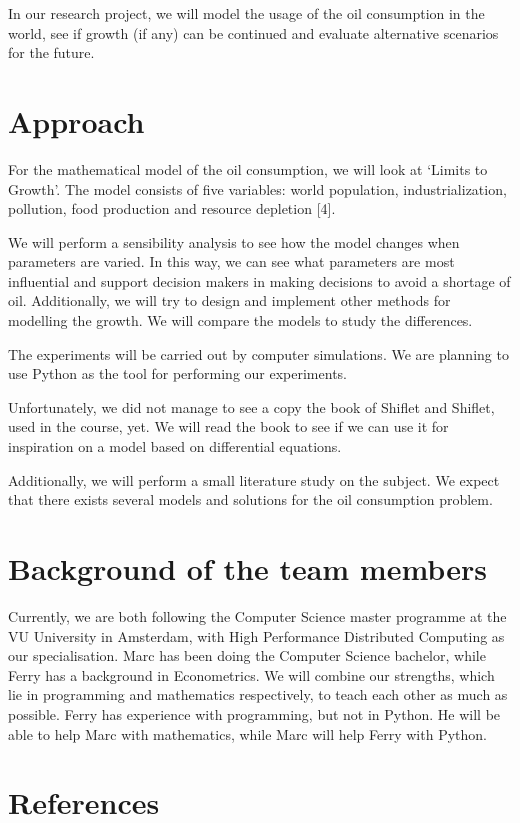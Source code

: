 \documentclass[10pt,a4paper]{article}
\begin{document}
In our research project, we will model the usage of the oil consumption in the world, see if growth (if any) can be continued and evaluate alternative scenarios for the future.

\section*{Approach}

For the mathematical model of the oil consumption, we will look at `Limits to Growth'. The model consists of five variables: world population, industrialization, pollution, food production and resource depletion [4].

We will perform a sensibility analysis to see how the model changes when parameters are varied. In this way, we can see what parameters are most influential and support decision makers in making decisions to avoid a shortage of oil. Additionally, we will try to design and implement other methods for modelling the growth. We will compare the models to study the differences.

The experiments will be carried out by computer simulations. We are planning to use Python as the tool for performing our experiments.

Unfortunately, we did not manage to see a copy the book of Shiflet and Shiflet, used in the course, yet. We will read the book to see if we can use it for inspiration on a model based on differential equations.

Additionally, we will perform a small literature study on the subject. We expect that there exists several models and solutions for the oil consumption problem.

\section*{Background of the team members}

Currently, we are both following the Computer Science master programme at the VU University in Amsterdam, with High Performance Distributed Computing as our specialisation. Marc has been doing the Computer Science bachelor, while Ferry has a background in Econometrics. We will combine our strengths, which lie in programming and mathematics respectively, to teach each other as much as possible. Ferry has experience with programming, but not in Python. He will be able to help Marc with mathematics, while Marc will help Ferry with Python.

\section*{References}
\end{document}
